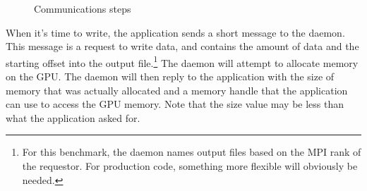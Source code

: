 \begin{figure}[!t]
{{    \label{fig:comm_d}}}    
\centerline{
  \hfil
  } 
\centerline{
  } 
\caption{Communications steps}
\label{fig_sim}
\end{figure}





When it's time to write, the application sends a short message to the daemon.  This message is a request to write data, and contains the amount of data and the starting offset into the output file.\footnote{For this benchmark, the daemon names output files based on the MPI rank of the requestor.  For production code, something more flexible will obviously be needed.}
  The daemon will attempt to allocate memory on the GPU.  The daemon will then reply to the application with the size of memory that was actually allocated and a memory handle that the application can use to access the GPU memory.  Note that the size value may be less than what the application asked for.

